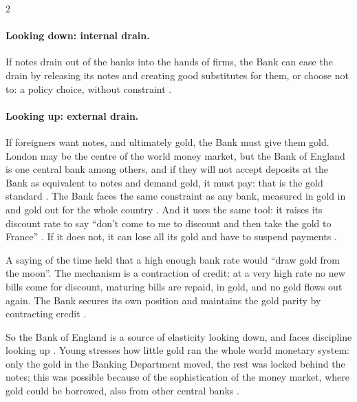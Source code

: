 \begin{paracol}{2}
\paragraph{Looking down: internal drain.} If notes drain out of the banks into the hands of firms, the Bank can ease the drain by releasing its notes and creating good substitutes for them,
or choose not to: a policy choice, without constraint .

\paragraph{Looking up: external drain.} If foreigners want notes, and ultimately gold, the Bank must give them gold. London may be the centre of the world money market, but the Bank of
England is one central bank among others, and if they will not accept deposits at the Bank as equivalent to notes and demand gold, it must pay: that is the gold standard
. The Bank faces the same constraint as any bank, measured in gold in and gold out for the whole country . And it uses the same tool: it
raises its discount rate to say ``don't come to me to discount and then take the gold to France'' . If it does not, it can lose all its gold and have to
suspend payments .

\begin{finance}
A saying of the time held that a high enough bank rate would ``draw gold from the moon''. The mechanism is a contraction of credit: at a very high rate no new bills come for discount,
maturing bills are repaid, in gold, and no gold flows out again. The Bank secures its own position and maintains the gold parity by contracting credit .
\end{finance}

So the Bank of England is a source of elasticity looking down, and faces discipline looking up . Young stresses how little gold ran the whole world monetary system: only the
gold in the Banking Department moved, the rest was locked behind the notes; this was possible because of the sophistication of the money market, where gold could be borrowed, also from other
central banks .


\end{paracol}
